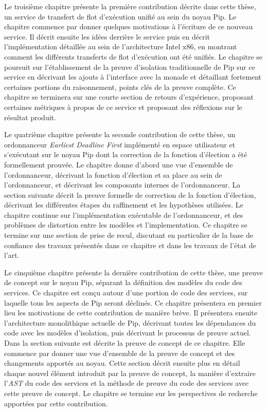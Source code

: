 Le troisième chapitre présente la première contribution décrite dans cette thèse, un service de transfert de flot d'exécution unifié au sein du noyau Pip. Le chapitre commence par donner quelques motivations à l'écriture de ce nouveau service. Il décrit ensuite les idées derrière le service puis en décrit l'implémentation détaillée au sein de l'architecture Intel x86, en montrant comment les différents transferts de flot d'exécution ont été unifiés. Le chapitre se poursuit sur l'établissement de la preuve d'isolation traditionnelle de Pip sur ce service en décrivant les ajouts à l'interface avec la monade et détaillant fortement certaines portions du raisonnement, points clés de la preuve complète. Ce chapitre se terminera sur une courte section de retours d'expérience, proposant certaines métriques à propos de ce service et proposant des réflexions sur le résultat produit. 

Le quatrième chapitre présente la seconde contribution de cette thèse, un ordonnanceur \emph{Earliest Deadline First} implémenté en espace utilisateur et s'exécutant sur le noyau Pip dont la correction de la fonction d'élection a été formellement prouvée. Le chapitre donne d'abord une vue d'ensemble de l'ordonnanceur, décrivant la fonction d'élection et sa place au sein de l'ordonnanceur, et décrivant les composants internes de l'ordonnanceur. La section suivante décrit la preuve formelle de correction de la fonction d'élection, décrivant les différentes étapes du raffinement et les hypothèses utilisées. Le chapitre continue sur l'implémentation exécutable de l'ordonnanceur, et des problèmes de distortion entre les modèles et l'implementation. Ce chapitre se termine sur une section de prise de recul, discutant en particulier de la base de confiance des travaux présentés dans ce chapitre et dans les travaux de l'état de l'art.

Le cinquième chapitre présente la dernière contribution de cette thèse, une preuve de concept sur le noyau Pip, séparant la définition des modèles du code des services. Ce chapitre est conçu autour d'une portion de code des services, sur laquelle tous les aspects de Pip seront déclinés. Ce chapitre présentera en premier lieu les motivations de cette contribution de manière brève. Il présentera ensuite l'architecture monolithique actuelle de Pip, décrivant toutes les dépendances du code avec les modèles d'isolation, puis décrivant le processus de preuve actuel. Dans la section suivante est décrite la preuve de concept de ce chapitre. Elle commence par donner une vue d'ensemble de la preuve de concept et des changements apportés au noyau. Cette section décrit ensuite plus en détail chaque nouvel élément introduit par la preuve de concept, la manière d'extraire l'\emph{AST} du code des services et la méthode de preuve du code des services avec cette preuve de concept. Le chapitre se termine sur les perspectives de recherche apportées par cette contribution.

